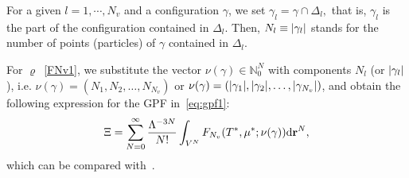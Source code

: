 \documentclass[12pt]{article}
\numberwithin{equation}{section}
\begin{document}
	For a given $l = 1, \cdots , N_v$ and a configuration $\gamma$, we set $\gamma_l = \gamma \cap \Delta_l,$ that is, $\gamma_l$ is the part of the configuration contained in $\Delta_l$. Then, $N_l \equiv \abs{\gamma_l}$ stands for the number of points (particles) of $\gamma$ contained in $\Delta_l$.
	
	For $\varrho$~\eqref{FNv1}, we substitute the vector $\nu(\gamma) \in \mathbb{N}_0^N$ with components $N_l$ (or $\abs{\gamma_l}$), i.e. $\nu(\gamma)=(N_1, N_2, \ldots, N_{N_v})$ or $\nu(\gamma) = (\abs{\gamma_1}, \abs{\gamma_2}, \ldots, \abs{\gamma_{N_v}})$, and obtain the following expression for the GPF in~\eqref{eq:gpf1}:
	\begin{equation}
		\Xi = \sum_{N=0}^{\infty} \frac{\Lambda^{-3N}}{N!}\int_{V^N} F_{N_v}(T^*,\mu^*;\nu(\gamma)) {\rm d} \vb{r}^N,
	\end{equation}
	which can be compared with~\cite[eq.~(2.8)]{KKD20}.
	
\end{document}
